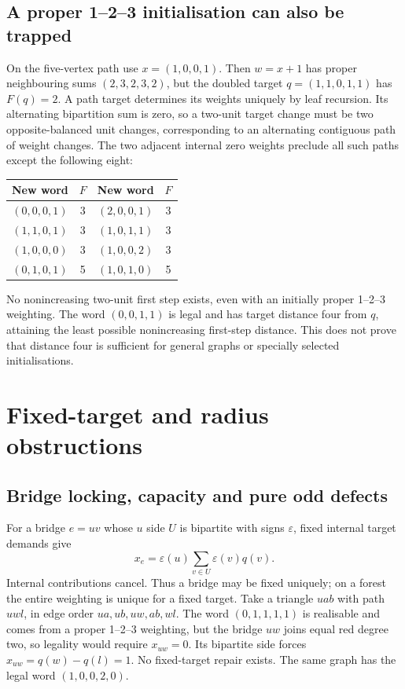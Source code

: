\subsection{A proper 1--2--3 initialisation can also be trapped}

On the five-vertex path use $x=(1,0,0,1)$. Then $w=x+1$ has
proper neighbouring sums $(2,3,2,3,2)$, but the doubled target
$q=(1,1,0,1,1)$ has $F(q)=2$. A path target determines its weights
uniquely by leaf recursion. Its alternating bipartition sum is zero,
so a two-unit target change must be two opposite-balanced unit
changes, corresponding to an alternating contiguous path of weight
changes. The two adjacent internal zero weights preclude all such
paths except the following eight:
\begin{center}\small
\begin{tabular}{cc@{\qquad}cc}\toprule
New word&$F$&New word&$F$\\\midrule
$(0,0,0,1)$&3&$(2,0,0,1)$&3\\
$(1,1,0,1)$&3&$(1,0,1,1)$&3\\
$(1,0,0,0)$&3&$(1,0,0,2)$&3\\
$(0,1,0,1)$&5&$(1,0,1,0)$&5\\\bottomrule
\end{tabular}
\end{center}
No nonincreasing two-unit first step exists, even with an initially
proper 1--2--3 weighting. The word $(0,0,1,1)$ is legal and has
target distance four from $q$, attaining the least possible
nonincreasing first-step distance. This does not prove that distance
four is sufficient for general graphs or specially selected initialisations.

\section{Fixed-target and radius obstructions}\label{sec:targetbarriers}

\subsection{Bridge locking, capacity and pure odd defects}

For a bridge $e=uv$ whose $u$ side $U$ is bipartite with signs
$\varepsilon$, fixed internal target demands give
\[
 x_e=\varepsilon(u)\sum_{v\in U}\varepsilon(v)q(v).
\]
Internal contributions cancel. Thus a bridge may be fixed uniquely;
on a forest the entire weighting is unique for a fixed target.
Take a triangle $uab$ with path $u w l$, in edge order
$ua,ub,uw,ab,wl$. The word $(0,1,1,1,1)$ is realisable and
comes from a proper 1--2--3 weighting, but the bridge $uw$ joins
equal red degree two, so legality would require $x_{uw}=0$.
Its bipartite side forces $x_{uw}=q(w)-q(l)=1$. No fixed-target
repair exists. The same graph has the legal word $(1,0,0,2,0)$.

